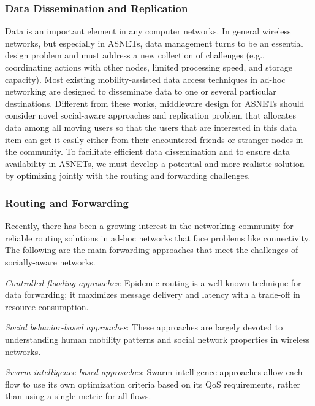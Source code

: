 \subsubsection{Data Dissemination and Replication}\label{Chap3_02_04_01}
Data is an important element in any computer networks. In general wireless networks, but especially in ASNETs, data management turns to be an essential design problem and must address a new collection of challenges (e.g., coordinating actions with other nodes, limited processing speed, and storage capacity). Most existing mobility-assisted data access techniques in ad-hoc networking are designed to disseminate data to one or several particular destinations. Different from these works, middleware design for ASNETs should consider novel social-aware approaches and replication problem that allocates data among all moving users so that the users that are interested in this data item can get it easily either from their encountered friends or stranger nodes in the community. To facilitate efficient data dissemination and to ensure data availability in ASNETs, we must develop a potential and more realistic solution by optimizing jointly with the routing and forwarding challenges.

\subsubsection{Routing and Forwarding}\label{Chap3_02_04_02}
Recently, there has been a growing interest in the networking community for reliable routing solutions in ad-hoc networks that face problems like connectivity.
The following are the main forwarding approaches that meet the challenges of socially-aware networks.

\emph{Controlled flooding approaches}: Epidemic routing is a well-known technique for data forwarding; it maximizes message delivery and latency with a trade-off in resource consumption.

\emph{Social behavior-based approaches}: These approaches are largely devoted to understanding human mobility patterns and social network properties in wireless networks.

\emph{Swarm intelligence-based approaches}: Swarm intelligence approaches allow each flow to use its own optimization criteria based on its QoS requirements, rather than using a single metric for all flows.

